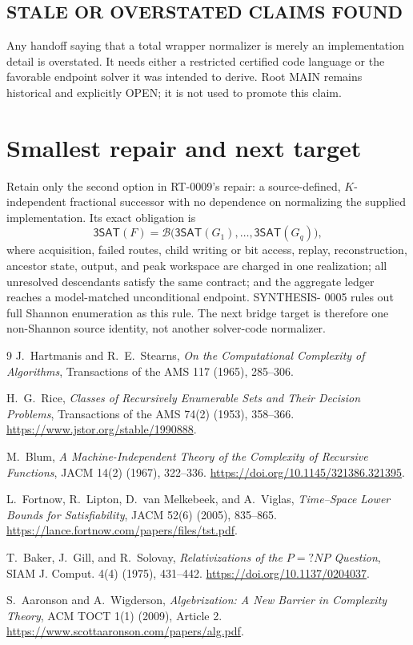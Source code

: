 \documentclass[11pt]{article}
\newcommand{\SAT}{\mathsf{3SAT}}
\begin{document}
\subsection*{STALE OR OVERSTATED CLAIMS FOUND}
Any handoff saying that a total wrapper normalizer is merely an implementation
detail is overstated.  It needs either a restricted certified code language or
the favorable endpoint solver it was intended to derive.  Root MAIN remains
historical and explicitly OPEN; it is not used to promote this claim.

\section{Smallest repair and next target}

Retain only the second option in RT-0009's repair: a source-defined,
$K$-independent fractional successor with no dependence on normalizing the
supplied implementation.  Its exact obligation is
\[
 \SAT(F)=\mathcal B\bigl(\SAT(G_1),\ldots,\SAT(G_q)\bigr), \tag{6}
\]
where acquisition, failed routes, child writing or bit access, replay,
reconstruction, ancestor state, output, and peak workspace are charged in one
realization; all unresolved descendants satisfy the same contract; and the
aggregate ledger reaches a model-matched unconditional endpoint.  SYNTHESIS-
0005 rules out full Shannon enumeration as this rule.  The next bridge target
is therefore one non-Shannon source identity, not another solver-code
normalizer.

\begin{thebibliography}{9}
J.~Hartmanis and R.~E.~Stearns,
\emph{On the Computational Complexity of Algorithms},
Transactions of the AMS 117 (1965), 285--306.

H.~G.~Rice,
\emph{Classes of Recursively Enumerable Sets and Their Decision Problems},
Transactions of the AMS 74(2) (1953), 358--366.
\url{https://www.jstor.org/stable/1990888}.

M.~Blum,
\emph{A Machine-Independent Theory of the Complexity of Recursive Functions},
JACM 14(2) (1967), 322--336.
\url{https://doi.org/10.1145/321386.321395}.

L.~Fortnow, R.~Lipton, D.~van Melkebeek, and A.~Viglas,
\emph{Time--Space Lower Bounds for Satisfiability},
JACM 52(6) (2005), 835--865.
\url{https://lance.fortnow.com/papers/files/tst.pdf}.

T.~Baker, J.~Gill, and R.~Solovay,
\emph{Relativizations of the $P=?NP$ Question},
SIAM J. Comput. 4(4) (1975), 431--442.
\url{https://doi.org/10.1137/0204037}.

S.~Aaronson and A.~Wigderson,
\emph{Algebrization: A New Barrier in Complexity Theory},
ACM TOCT 1(1) (2009), Article 2.
\url{https://www.scottaaronson.com/papers/alg.pdf}.
\end{thebibliography}
\end{document}
